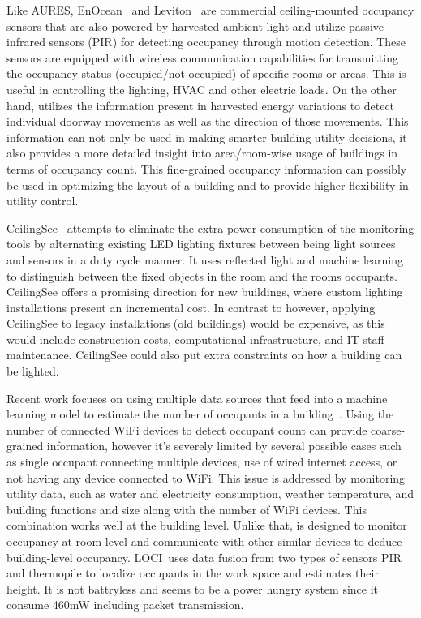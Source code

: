 Like AURES, EnOcean~\cite{EnOcean} and Leviton~\cite{Leviton} are commercial ceiling-mounted occupancy sensors that are also powered by harvested ambient light and utilize passive infrared sensors (PIR) for detecting occupancy through motion detection. These sensors are equipped with wireless communication capabilities for transmitting the occupancy status (occupied/not occupied) of specific rooms or areas. This is useful in controlling the lighting, HVAC and other electric loads. On the other hand, \sysname utilizes the information present in harvested energy variations to detect individual doorway movements as well as the direction of those movements. This information can not only be used in making smarter building utility decisions, it also provides a more detailed insight into area/room-wise usage of buildings in terms of occupancy count. This fine-grained occupancy information can possibly be used in optimizing the layout of a building and to provide higher flexibility in utility control.

CeilingSee~\cite{yang2017ceilingsee} attempts to eliminate the extra power consumption of the monitoring tools by alternating existing LED lighting fixtures between being light sources and sensors in a duty cycle manner.
It uses reflected light and machine learning to distinguish between the fixed objects in the room and the rooms occupants.
CeilingSee offers a promising direction for new buildings, where custom lighting installations present an incremental cost. 
In contrast to \sysname however, applying CeilingSee to legacy installations (old buildings) would be expensive, as this would include construction costs, computational infrastructure, and IT staff maintenance.
CeilingSee could also put extra constraints on how a building can be lighted.

Recent work focuses on using multiple data sources that feed into a machine learning model to estimate the number of occupants in a building~\cite{das2017non}. Using the number of connected WiFi devices to detect occupant count can provide coarse-grained information, however it's severely limited by several possible cases such as single occupant connecting multiple devices, use of wired internet access, or not having any device connected to WiFi. This issue is addressed by monitoring utility data, such as water and electricity consumption, weather temperature, and building functions and size along with the number of WiFi devices. This combination works well at the building level. Unlike that, \sysname is designed to monitor occupancy at room-level and communicate with other similar devices to deduce building-level occupancy. 
LOCI~\cite{narayanaloci}uses data fusion from two types of sensors PIR and thermopile to localize occupants in the work space and estimates their height. It is not battryless and seems to be a power hungry system since it consume 460mW including packet transmission. 


